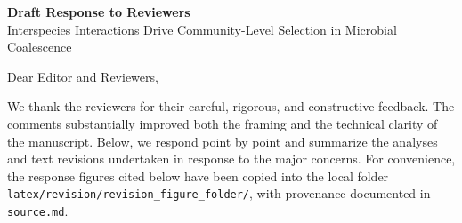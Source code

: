 \documentclass[11pt]{article}
\begin{document}
\begin{center}
{\Large \textbf{Draft Response to Reviewers}}\\[0.5em]
{\large Interspecies Interactions Drive Community-Level Selection in Microbial Coalescence}
\end{center}

Dear Editor and Reviewers,

We thank the reviewers for their careful, rigorous, and constructive feedback. The comments substantially improved both the framing and the technical clarity of the manuscript. Below, we respond point by point and summarize the analyses and text revisions undertaken in response to the major concerns. For convenience, the response figures cited below have been copied into the local folder \texttt{latex/revision/revision\_figure\_folder/}, with provenance documented in \texttt{source.md}.


\clearpage

\clearpage

\end{document}
